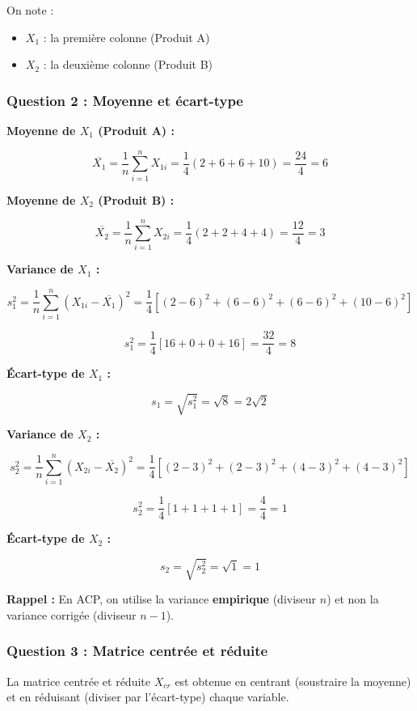 \documentclass[11pt,a4paper]{article}
\begin{document}
On note :
\begin{itemize}
    \item $X_1$ : la première colonne (Produit A)
    \item $X_2$ : la deuxième colonne (Produit B)
\end{itemize}

\subsubsection{Question 2 : Moyenne et écart-type}

\textbf{Moyenne de $X_1$ (Produit A) :}

$$\overline{X_1} = \frac{1}{n} \sum_{i=1}^{n} X_{1i} = \frac{1}{4}(2 + 6 + 6 + 10) = \frac{24}{4} = 6$$

\textbf{Moyenne de $X_2$ (Produit B) :}

$$\overline{X_2} = \frac{1}{n} \sum_{i=1}^{n} X_{2i} = \frac{1}{4}(2 + 2 + 4 + 4) = \frac{12}{4} = 3$$

\textbf{Variance de $X_1$ :}

$$s_1^2 = \frac{1}{n} \sum_{i=1}^{n} (X_{1i} - \overline{X_1})^2 = \frac{1}{4}[(2-6)^2 + (6-6)^2 + (6-6)^2 + (10-6)^2]$$

$$s_1^2 = \frac{1}{4}[16 + 0 + 0 + 16] = \frac{32}{4} = 8$$

\textbf{Écart-type de $X_1$ :}

$$s_1 = \sqrt{s_1^2} = \sqrt{8} = 2\sqrt{2}$$

\textbf{Variance de $X_2$ :}

$$s_2^2 = \frac{1}{n} \sum_{i=1}^{n} (X_{2i} - \overline{X_2})^2 = \frac{1}{4}[(2-3)^2 + (2-3)^2 + (4-3)^2 + (4-3)^2]$$

$$s_2^2 = \frac{1}{4}[1 + 1 + 1 + 1] = \frac{4}{4} = 1$$

\textbf{Écart-type de $X_2$ :}

$$s_2 = \sqrt{s_2^2} = \sqrt{1} = 1$$

\begin{astucebox}
\textbf{Rappel :} En ACP, on utilise la variance \textbf{empirique} (diviseur $n$) et non la variance corrigée (diviseur $n-1$).
\end{astucebox}

\subsubsection{Question 3 : Matrice centrée et réduite}

La matrice centrée et réduite $X_{cr}$ est obtenue en centrant (soustraire la moyenne) et en réduisant (diviser par l'écart-type) chaque variable.
\end{document}
